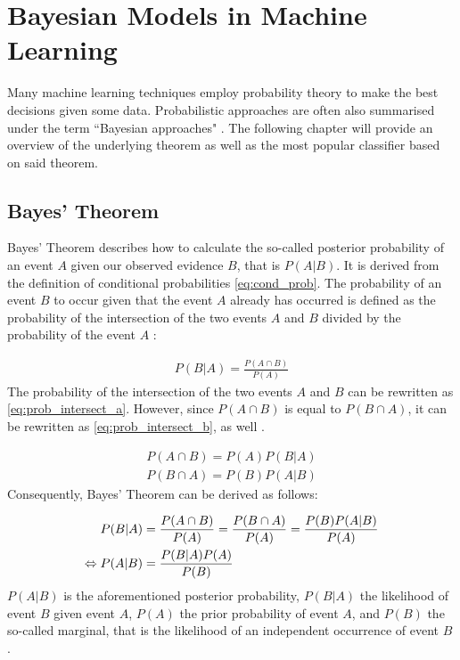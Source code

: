 \chapter{Bayesian Models in Machine Learning}

Many machine learning techniques employ probability theory to make the best decisions given some data. Probabilistic approaches are often also summarised under the term ``Bayesian approaches" \citep{Murphy2012}. The following chapter will provide an overview of the underlying theorem as well as the most popular classifier based on said theorem.

\section{Bayes' Theorem} \label{sec:bayes_theorem}

Bayes' Theorem describes how to calculate the so-called posterior probability of an event $A$ given our observed evidence $B$, that is $P(A|B)$. It is derived from the definition of conditional probabilities \eqref{eq:cond_prob}. The probability of an event $B$ to occur given that the event $A$ already has occurred is defined as the probability of the intersection of the two events $A$ and $B$ divided by the probability of the event $A$ \citep{Murphy2012}:

\begin{gather}
    P(B|A) = \frac{P(A \cap B)}{P(A)} \label{eq:cond_prob}
\end{gather}
The probability of the intersection of the two events $A$ and $B$ can be rewritten as \eqref{eq:prob_intersect_a}. However, since $P(A \cap B)$ is equal to $P(B \cap A)$, it can be rewritten as \eqref{eq:prob_intersect_b}, as well \citep{Manning2009}. 

\begin{gather}
    P(A \cap B) = P(A) P(B|A) \label{eq:prob_intersect_a}
\end{gather}
\begin{gather}
    P(B \cap A) = P(B) P(A|B) \label{eq:prob_intersect_b}
\end{gather}
Consequently, Bayes' Theorem can be derived as follows:


\begin{align}
    P(B|A)  &= \frac{P(A \cap B)}{P(A)}
           = \frac{P(B \cap A)}{P(A)}
            = \frac{P(B) P(A|B)}{P(A)} \notag\\
    \Leftrightarrow P(A|B) &= \frac{P(B|A) P(A)}{P(B)} \label{eq:BT_derived}
\end{align}
$P(A|B)$ is the aforementioned posterior probability, $P(B|A)$ the likelihood of event $B$ given event $A$, $P(A)$ the prior probability of event $A$, and $P(B)$ the so-called marginal, that is the likelihood of an independent occurrence of event $B$ \citep{Manning2009, Rijsbergen1979}.

